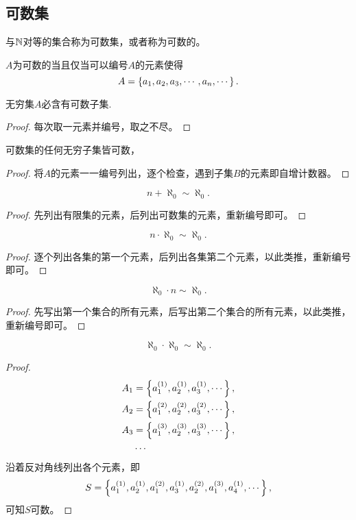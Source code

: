\documentclass{ctexrep}
\begin{document}
  \subsection{可数集}
  \begin{definition}
    与$\mathbb{N}$对等的集合称为可数集，或者称为可数的。
  \end{definition}
  \begin{theorem}
    $A$为可数的当且仅当可以编号$A$的元素使得
    \[ A = \left\{a_1, a_2, a_3, \cdots, a_n, \cdots\right\}. \]
  \end{theorem}
  \begin{theorem}
    无穷集$A$必含有可数子集.
  \end{theorem}
  \begin{proof}
    每次取一元素并编号，取之不尽。
  \end{proof}
  \begin{theorem}
    \label{thm:coutablesub}
    可数集的任何无穷子集皆可数，
  \end{theorem}
  \begin{proof}
    将$A$的元素一一编号列出，逐个检查，遇到子集$B$的元素即自增计数器。
  \end{proof}
  \begin{theorem}
    \[ n+\aleph_0\sim\aleph_0. \]
  \end{theorem}
  \begin{proof}
    先列出有限集的元素，后列出可数集的元素，重新编号即可。
  \end{proof}
  \begin{theorem}
    \[ n\cdot\aleph_0\sim\aleph_0. \]
  \end{theorem}
  \begin{proof}
    逐个列出各集的第一个元素，后列出各集第二个元素，以此类推，重新编号即可。
  \end{proof}
  \begin{theorem}
    \[ \aleph_0 \cdot n \sim \aleph_0. \]
  \end{theorem}
  \begin{proof}
    先写出第一个集合的所有元素，后写出第二个集合的所有元素，以此类推，重新编号即可。
  \end{proof}
  \begin{theorem}
    \label{thm:countableprod}
    \[ \aleph_0\cdot\aleph_0\sim\aleph_0. \]
  \end{theorem}
  \begin{proof}
    \begin{align*}
      A_1 &= \left\{a_{1}^{\left(1\right)},a_{2}^{\left(1\right)},a_{3}^{\left(1\right)},\cdots\right\},\\
      A_2 &= \left\{a_{1}^{\left(2\right)},a_{2}^{\left(2\right)},a_{3}^{\left(2\right)},\cdots\right\},\\
      A_3 &= \left\{a_{1}^{\left(3\right)},a_{2}^{\left(3\right)},a_{3}^{\left(3\right)},\cdots\right\},\\
      &\cdots
    \end{align*}
    沿着反对角线列出各个元素，即
    \[ S = \left\{a_{1}^{\left(1\right)},a_{2}^{\left(1\right)},a_{1}^{\left(2\right)},a_{3}^{\left(1\right)},a_{2}^{\left(2\right)},a_{1}^{\left(3\right)},a_{4}^{\left(1\right)},\cdots\right\}, \]
    可知$S$可数。
  \end{proof}
\end{document}
